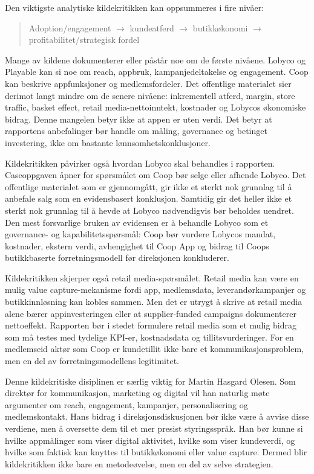 \documentclass[12pt,a4paper]{article}
\begin{document}
Den viktigste analytiske kildekritikken kan oppsummeres i fire nivåer:

\begin{quote}
Adoption/engagement $\rightarrow$ kundeatferd $\rightarrow$ butikkøkonomi $\rightarrow$ profitabilitet/strategisk fordel
\end{quote}

Mange av kildene dokumenterer eller påstår noe om de første nivåene. Lobyco og Playable kan si noe om reach, appbruk, kampanjedeltakelse og engagement. Coop kan beskrive appfunksjoner og medlemsfordeler. Det offentlige materialet sier derimot langt mindre om de senere nivåene: inkrementell atferd, margin, store traffic, basket effect, retail media-nettoinntekt, kostnader og Lobycos økonomiske bidrag. Denne mangelen betyr ikke at appen er uten verdi. Det betyr at rapportens anbefalinger bør handle om måling, governance og betinget investering, ikke om bastante lønnsomhetskonklusjoner.

Kildekritikken påvirker også hvordan Lobyco skal behandles i rapporten. Caseoppgaven åpner for spørsmålet om Coop bør selge eller afhende Lobyco. Det offentlige materialet som er gjennomgått, gir ikke et sterkt nok grunnlag til å anbefale salg som en evidensbasert konklusjon. Samtidig gir det heller ikke et sterkt nok grunnlag til å hevde at Lobyco nødvendigvis bør beholdes uendret. Den mest forsvarlige bruken av evidensen er å behandle Lobyco som et governance- og kapabilitetsspørsmål: Coop bør vurdere Lobycos mandat, kostnader, ekstern verdi, avhengighet til Coop App og bidrag til Coops butikkbaserte forretningsmodell før direksjonen konkluderer.

Kildekritikken skjerper også retail media-spørsmålet. Retail media kan være en mulig value capture-mekanisme fordi app, medlemsdata, leverandørkampanjer og butikkinnløsning kan kobles sammen. Men det er utrygt å skrive at retail media alene bærer appinvesteringen eller at supplier-funded campaigns dokumenterer nettoeffekt. Rapporten bør i stedet formulere retail media som et mulig bidrag som må testes med tydelige KPI-er, kostnadsdata og tillitsvurderinger. For en medlemseid aktør som Coop er kundetillit ikke bare et kommunikasjonsproblem, men en del av forretningsmodellens legitimitet.

Denne kildekritiske disiplinen er særlig viktig for Martin Hasgard Olesen. Som direktør for kommunikasjon, marketing og digital vil han naturlig møte argumenter om reach, engagement, kampanjer, personalisering og medlemskontakt. Hans bidrag i direksjonsdiskusjonen bør ikke være å avvise disse verdiene, men å oversette dem til et mer presist styringsspråk. Han bør kunne si hvilke appmålinger som viser digital aktivitet, hvilke som viser kundeverdi, og hvilke som faktisk kan knyttes til butikkøkonomi eller value capture. Dermed blir kildekritikken ikke bare en metodeøvelse, men en del av selve strategien.
\end{document}
